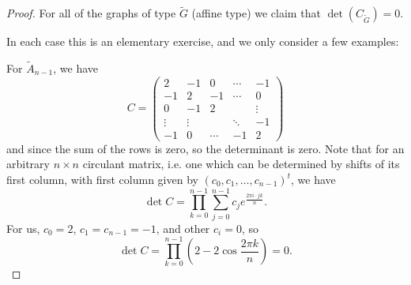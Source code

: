 \begin{proof}
For all of the graphs of type $\widetilde{G}$ (affine type) we claim that $\det
(C_{\widetilde{G}}) = 0$.

In each case this is an elementary exercise, and we only consider a few examples:

For $\widetilde{A}_{n-1}$, we have
\[
    C = \begin{pmatrix}
        2 & -1 & 0 & \cdots & -1 \\
        -1 & 2 & -1 & \cdots & 0 \\
        0 & -1 & 2 & & \vdots \\
        \vdots & \vdots & & \ddots & -1 \\
        -1 & 0 & \cdots & -1 & 2
    \end{pmatrix}
\]
and since the sum of the rows is zero, so the determinant is zero.
Note that for an arbitrary $n \times n$ circulant matrix, i.e. one which can
be determined by shifts of its first column, with first column given by
$(c_0, c_1, \dots, c_{n-1})^t$, we have
\[
    \det C = \prod_{k=0}^{n-1} \sum_{j=0}^{n-1} c_j e^{\frac{2\pi i \cdot jk}{n}}.
\]
For us, $c_0 = 2$, $c_1 = c_{n-1} = -1$, and other $c_i = 0$, so
\[
    \det C = \prod_{k=0}^{n-1} \left(2-2 \cos \frac{2 \pi k}{n}\right) = 0.
\]
\end{proof}

